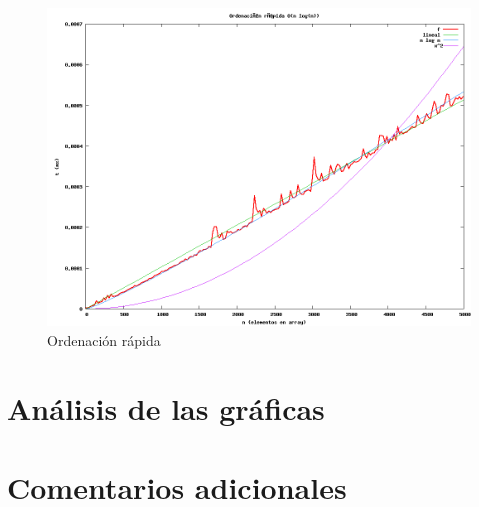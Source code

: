 \documentclass[11pt]{article}
\begin{document}
\begin{figure}
  \centering
    \includegraphics[width=1.0\textwidth]{quick-sort.png}
  \caption{Ordenación rápida}
  \label{fig:quick}
\end{figure}

\newpage
\section{Análisis de las gráficas}




\newpage
\section{Comentarios adicionales}
\end{document}
